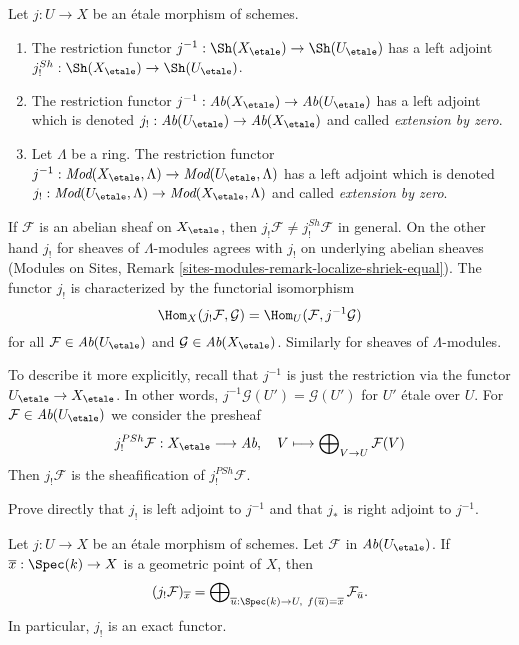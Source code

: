 \begin{definition}
\label{definition-extension-zero}
Let $j : U \to X$ be an \'etale morphism of schemes.
\begin{enumerate}
\item The restriction functor
$j^{-1} : \Sh(X_\etale) \to \Sh(U_\etale)$
has a left adjoint
$j_!^{Sh} : \Sh(X_\etale) \to \Sh(U_\etale)$.
\item The restriction functor
$j^{-1} : \textit{Ab}(X_\etale) \to \textit{Ab}(U_\etale)$
has a left adjoint which is denoted
$j_! : \textit{Ab}(U_\etale) \to \textit{Ab}(X_\etale)$
and called {\it extension by zero}.
\item Let $\Lambda$ be a ring. The restriction functor
$j^{-1} : \textit{Mod}(X_\etale, \Lambda) \to
\textit{Mod}(U_\etale, \Lambda)$
has a left adjoint which is denoted
$j_! : \textit{Mod}(U_\etale, \Lambda) \to
\textit{Mod}(X_\etale, \Lambda)$
and called {\it extension by zero}.
\end{enumerate}
\end{definition}

\noindent
If $\mathcal{F}$ is an abelian sheaf on $X_\etale$, then
$j_!\mathcal{F} \not = j_!^{Sh}\mathcal{F}$ in general. On the other hand
$j_!$ for sheaves of $\Lambda$-modules agrees with $j_!$ on underlying
abelian sheaves
(Modules on Sites, Remark \ref{sites-modules-remark-localize-shriek-equal}).
The functor $j_!$ is characterized by the functorial isomorphism
$$
\Hom_X(j_!\mathcal{F}, \mathcal{G}) = \Hom_U(\mathcal{F}, j^{-1}\mathcal{G})
$$
for all $\mathcal{F} \in \textit{Ab}(U_\etale)$ and
$\mathcal{G} \in \textit{Ab}(X_\etale)$. Similarly for
sheaves of $\Lambda$-modules.

\medskip\noindent
To describe it more explicitly, recall that $j^{-1}$ is just the restriction
via the functor $U_\etale \to X_\etale$. In other words,
$j^{-1}\mathcal{G}(U') = \mathcal{G}(U')$ for $U'$ \'etale over $U$.
For $\mathcal{F} \in \textit{Ab}(U_\etale)$
we consider the presheaf
$$
j_!^{PSh}\mathcal{F} : X_\etale \longrightarrow \textit{Ab},
\quad
V \longmapsto \bigoplus\nolimits_{V \to U} \mathcal{F}(V)
$$
Then $j_!\mathcal{F}$ is the sheafification of $j_!^{PSh}\mathcal{F}$.

\begin{exercise}
\label{exercise-jshriek-direct}
Prove directly that $j_!$ is left adjoint to $j^{-1}$ and that $j_*$ is right
adjoint to $j^{-1}$.
\end{exercise}

\begin{proposition}
\label{proposition-describe-jshriek}
Let $j : U \to X$ be an \'etale morphism of schemes.
Let $\mathcal{F}$ in $\textit{Ab}(U_\etale)$.
If $\overline{x} : \Spec(k) \to X$ is a geometric point of $X$, then 
$$
(j_!\mathcal{F})_{\overline{x}} =
\bigoplus\nolimits_{\overline{u} : \Spec(k) \to U,\ f(\overline{u}) =
\overline{x}} \mathcal{F}_{\bar{u}}.
$$
In particular, $j_!$ is an exact functor.
\end{proposition}


